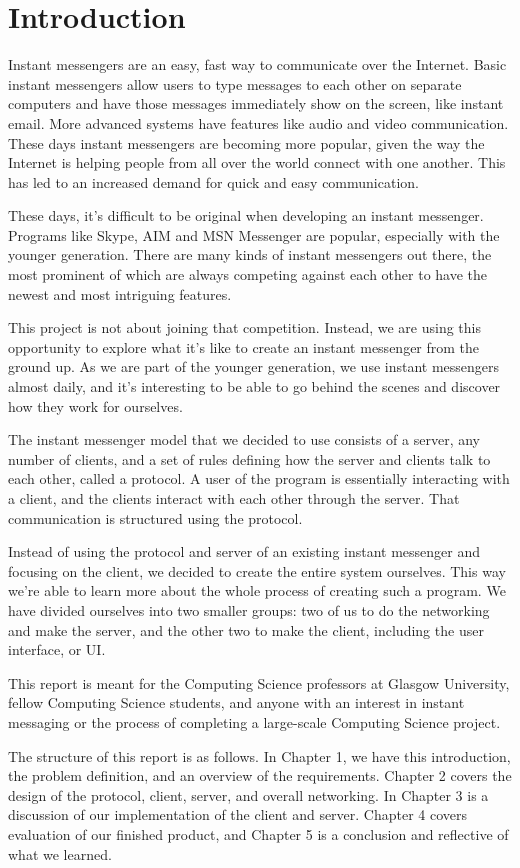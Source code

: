 \section{Introduction}

Instant messengers are an easy, fast way to communicate over the Internet. Basic instant messengers allow users to type messages to each other on separate computers and have those messages immediately show on the screen, like instant email. More advanced systems have features like audio and video communication. These days instant messengers are becoming more popular, given the way the Internet is helping people from all over the world connect with one another. This has led to an increased demand for quick and easy communication.

These days, it’s difficult to be original when developing an instant messenger. Programs like Skype, AIM and MSN Messenger are popular, especially with the younger generation. There are many kinds of instant messengers out there, the most prominent of which are always competing against each other to have the newest and most intriguing features.

This project is not about joining that competition. Instead, we are using this opportunity to explore what it’s like to create an instant messenger from the ground up. As we are part of the younger generation, we use instant messengers almost daily, and it’s interesting to be able to go behind the scenes and discover how they work for ourselves.

The instant messenger model that we decided to use consists of a server, any number of clients, and a set of rules defining how the server and clients talk to each other, called a protocol. A user of the program is essentially interacting with a client, and the clients interact with each other through the server. That communication is structured using the protocol.

Instead of using the protocol and server of an existing instant messenger and focusing on the client, we decided to create the entire system ourselves. This way we’re able to learn more about the whole process of creating such a program. We have divided ourselves into two smaller groups: two of us to do the networking and make the server, and the other two to make the client, including the user interface, or UI.

This report is meant for the Computing Science professors at Glasgow University, fellow Computing Science students, and anyone with an interest in instant messaging or the process of completing a large-scale Computing Science project.

The structure of this report is as follows. In Chapter 1, we have this introduction, the problem definition, and an overview of the requirements. Chapter 2 covers the design of the protocol, client, server, and overall networking. In Chapter 3 is a discussion of our implementation of the client and server. Chapter 4 covers evaluation of our finished product, and Chapter 5 is a conclusion and reflective of what we learned.
